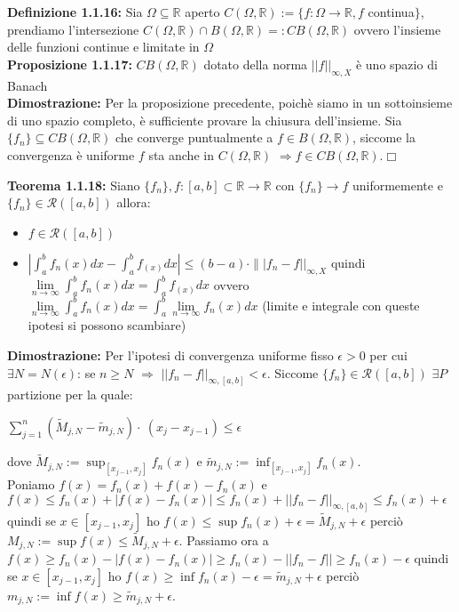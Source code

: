 \documentclass[a4paper,11pt,titlepage]{book}
\begin{document}
\textbf{Definizione 1.1.16:} Sia $\Omega \subseteq \mathbb{R}$ aperto $C(\Omega,\mathbb{R}):=\{f:\Omega\rightarrow\mathbb{R}, f$ continua$\}$, prendiamo l'intersezione $C(\Omega,\mathbb{R})\cap B(\Omega,\mathbb{R})=:CB(\Omega,\mathbb{R})$ ovvero l'insieme delle funzioni continue e limitate in $\Omega$\\

\textbf{Proposizione 1.1.17:} $CB(\Omega,\mathbb{R})$ dotato della norma $||f||_{\infty,X}$ è uno spazio di Banach\\

\textbf{Dimostrazione:} Per la proposizione precedente, poichè siamo in un sottoinsieme di uno spazio completo, è sufficiente provare la chiusura dell'insieme. Sia $\{f_{n}\}\subseteq CB(\Omega,\mathbb{R})$ che converge puntualmente a $f\in B(\Omega,\mathbb{R})$, siccome la convergenza è uniforme $f$ sta anche in $C(\Omega,\mathbb{R})$ $\Rightarrow f \in CB(\Omega,\mathbb{R})$.$\Box$

\textbf{Teorema 1.1.18:} Siano $\{f_{n}\},f:[a,b]\subset\mathbb{R}\rightarrow\mathbb{R}$ con $\{f_{n}\}\rightarrow f$ uniformemente e  $\{f_{n}\}\in\mathcal{R}([a,b])$ allora:
\begin{itemize}
\item $f\in \mathcal{R}([a,b])$
\item $|\int_{a}^{b}f_{n}(x)dx-\int_{a}^{b}f_(x)dx|\leq (b-a)\cdot\||f_{n}-f||_{\infty,X}$ quindi $\lim\limits_{n \to \infty}\int_{a}^{b}f_{n}(x)dx=\int_{a}^{b}f_(x)dx$ ovvero $\lim\limits_{n \to \infty}\int_{a}^{b}f_{n}(x)dx=\int_{a}^{b}\lim\limits_{n \to \infty}{f_{n}(x)}dx$ (limite e integrale con queste ipotesi si possono scambiare) \\
\end{itemize}

\textbf{Dimostrazione:} Per l'ipotesi di convergenza uniforme fisso $\epsilon >0$ per cui $\exists{N}=N(\epsilon)$: se $n\geq{N}$ $\Rightarrow$ $||f_{n}-f||_{\infty,[a,b]}<\epsilon$. Siccome $\{f_{n}\}\in\mathcal{R}([a,b])$ $\exists P$ partizione per la quale:

\begin{center}
 $\sum_{j=1}^n (\widetilde{M}_{j,N}-\widetilde{m}_{j,N})\cdot\ (x_{j}-x_{j-1})\leq\epsilon$
\end{center}

 dove $\widetilde{M}_{j,N}:=\sup_{[x_{j-1},x_{j}]}f_{n}(x)$ e $\widetilde{m}_{j,N}:=\inf_{[x_{j-1},x_{j}]}f_{n}(x)$. \\
 
 Poniamo $f(x)=f_{n}(x)+f(x)-f_{n}(x)$ e $f(x)\leq f_{n}(x)+|f(x)-f_{n}(x)|\leq f_{n}(x)+||f_{n}-f||_{\infty,[a,b]}\leq f_{n}(x)+\epsilon$ quindi se $x\in [x_{j-1},x_{j}] $ ho $f(x) \leq \sup f_{n}(x)+\epsilon=\widetilde{M}_{j,N}+\epsilon$ perciò $M_{j,N}:=\sup f(x)\leq\widetilde{M}_{j,N}+\epsilon$. Passiamo ora a $f(x)\geq f_{n}(x)-|f(x)-f_{n}(x)|\geq f_{n}(x)-||f_{n}-f|| \geq f_{n}(x)-\epsilon$ quindi se $x\in [x_{j-1},x_{j}] $ ho $f(x) \geq \inf f_{n}(x)-\epsilon=\widetilde{m}_{j,N}+\epsilon$ perciò $m_{j,N}:=\inf f(x)\geq\widetilde{m}_{j,N}+\epsilon$. \\
\end{document}

